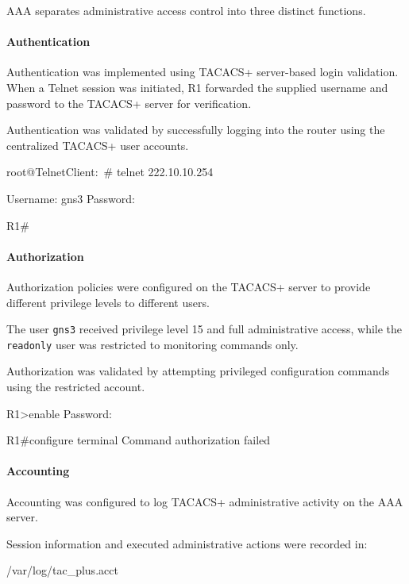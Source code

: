 \documentclass[12pt]{article}
\begin{document}
AAA separates administrative access control into three distinct functions.

\paragraph{Authentication}

Authentication was implemented using TACACS+ server-based
login validation. When a Telnet session was initiated,
R1 forwarded the supplied username and password to the
TACACS+ server for verification.

Authentication was validated by successfully logging into
the router using the centralized TACACS+ user accounts.

\begin{configbox}
root@TelnetClient:~# telnet 222.10.10.254

Username: gns3
Password:

R1#
\end{configbox}

\paragraph{Authorization}

Authorization policies were configured on the TACACS+
server to provide different privilege levels to different users.

The user \texttt{gns3} received privilege level 15 and full
administrative access, while the \texttt{readonly} user was
restricted to monitoring commands only.

Authorization was validated by attempting privileged
configuration commands using the restricted account.

\begin{configbox}
R1>enable
Password:

R1#configure terminal
Command authorization failed
\end{configbox}

\paragraph{Accounting}

Accounting was configured to log TACACS+ administrative
activity on the AAA server.

Session information and executed administrative actions
were recorded in:

\begin{configbox}
/var/log/tac_plus.acct
\end{configbox}
\end{document}
